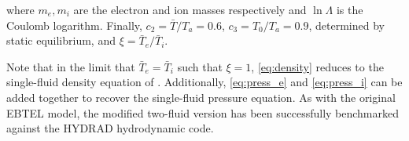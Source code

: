 \documentclass[apj]{emulateapj}
\begin{document}
		where $m_e,m_i$ are the electron and ion masses respectively and $\ln{\Lambda}$ is the Coulomb logarithm. Finally, $c_2=\bar{T}/T_a=0.6$, $c_3=T_0/T_a=0.9$, determined by static equilibrium, and $\xi=\bar{T}_e/\bar{T}_i$.
		\par Note that in the limit that $\bar{T}_e=\bar{T}_i$ such that $\xi=1$, \autoref{eq:density} reduces to the single-fluid density equation of \citet{cargill_enthalpy-based_2012}. Additionally, \autoref{eq:press_e} and \autoref{eq:press_i} can be added together to recover the single-fluid pressure equation. As with the original EBTEL model, the modified two-fluid version has been successfully benchmarked against the HYDRAD hydrodynamic code.
	
	
	\clearpage
\end{document}
